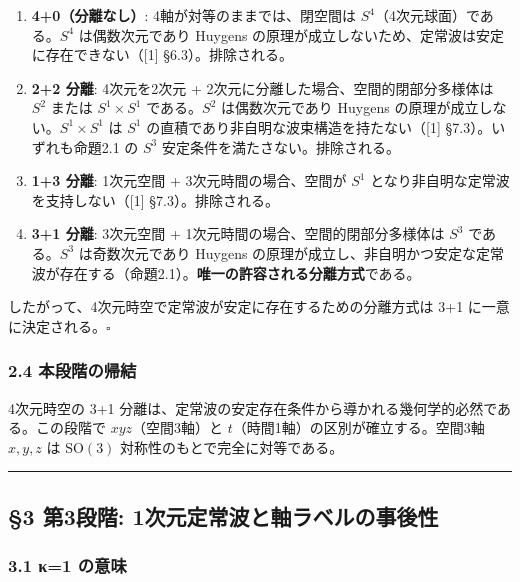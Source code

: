 \documentclass[
  a4paper,11pt]{ltjsarticle}
\begin{document}
\begin{enumerate}
\def\labelenumi{(\roman{enumi})}
\item
  \textbf{4+0（分離なし）}: 4軸が対等のままでは、閉空間は
  \(S^4\)（4次元球面）である。\(S^4\) は偶数次元であり Huygens
  の原理が成立しないため、定常波は安定に存在できない（{[}1{]}
  §6.3）。排除される。
\item
  \textbf{2+2 分離}: 4次元を2次元 +
  2次元に分離した場合、空間的閉部分多様体は \(S^2\) または
  \(S^1 \times S^1\) である。\(S^2\) は偶数次元であり Huygens
  の原理が成立しない。\(S^1 \times S^1\) は \(S^1\)
  の直積であり非自明な波束構造を持たない（{[}1{]}
  §7.3）。いずれも命題2.1 の \(S^3\) 安定条件を満たさない。排除される。
\item
  \textbf{1+3 分離}: 1次元空間 + 3次元時間の場合、空間が \(S^1\)
  となり非自明な定常波を支持しない（{[}1{]} §7.3）。排除される。
\item
  \textbf{3+1 分離}: 3次元空間 + 1次元時間の場合、空間的閉部分多様体は
  \(S^3\) である。\(S^3\) は奇数次元であり Huygens
  の原理が成立し、非自明かつ安定な定常波が存在する（命題2.1）。\textbf{唯一の許容される分離方式}である。
\end{enumerate}

したがって、4次元時空で定常波が安定に存在するための分離方式は 3+1
に一意に決定される。\(\square\)

\subsubsection{2.4
本段階の帰結}\label{ux672cux6bb5ux968eux306eux5e30ux7d50-1}

4次元時空の 3+1
分離は、定常波の安定存在条件から導かれる幾何学的必然である。この段階で
\(xyz\)（空間3軸）と \(t\)（時間1軸）の区別が確立する。空間3軸
\(x, y, z\) は \(\mathrm{SO}(3)\) 対称性のもとで完全に対等である。

\begin{center}\rule{0.5\linewidth}{0.5pt}\end{center}

\subsection{§3 第3段階:
1次元定常波と軸ラベルの事後性}\label{ux7b2c3ux6bb5ux968e-1ux6b21ux5143ux5b9aux5e38ux6ce2ux3068ux8ef8ux30e9ux30d9ux30ebux306eux4e8bux5f8cux6027}

\subsubsection{3.1 κ=1 の意味}\label{ux3ba1-ux306eux610fux5473}
\end{document}
